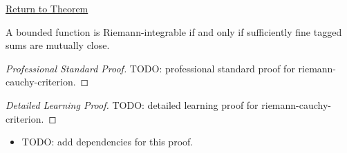 \newpage
{}
\label{prf:riemann-cauchy-criterion}
\begin{remark*}[Return]\hyperref[thm:riemann-cauchy-criterion]{Return to Theorem}\end{remark*}

\begin{theorem*}
A bounded function is Riemann-integrable if and only if sufficiently fine
tagged sums are mutually close.
\end{theorem*}

\begin{proof}[Professional Standard Proof]
\LRAProofBodyStart
TODO: professional standard proof for riemann-cauchy-criterion.
\end{proof}

\begin{proof}[Detailed Learning Proof]
\LRAProofBodyStart
TODO: detailed learning proof for riemann-cauchy-criterion.
\end{proof}

\begin{remark*}
\end{remark*}

\begin{dependencies}
\begin{itemize}
  \item TODO: add dependencies for this proof.
\end{itemize}
\end{dependencies}

\clearpage
